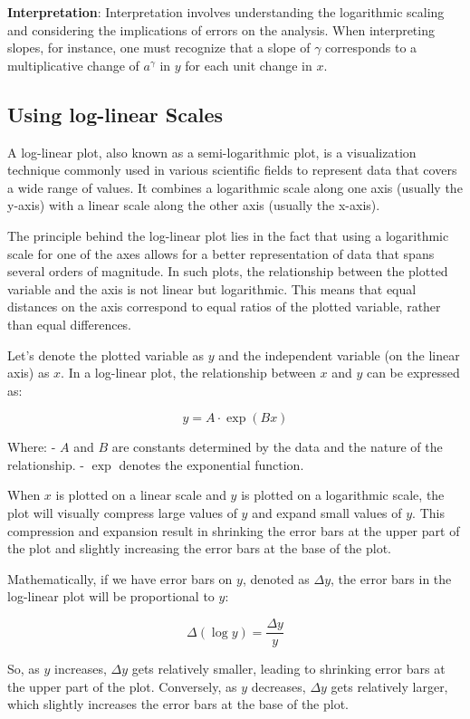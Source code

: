 \documentclass{article}
\begin{document}
\textbf{Interpretation}:
Interpretation involves understanding the logarithmic scaling and considering the implications of errors on the analysis. When interpreting slopes, for instance, one must recognize that a slope of $\gamma$ corresponds to a multiplicative change of $a^\gamma$ in $y$ for each unit change in $x$.



\subsection{Using log-linear Scales}
A log-linear plot, also known as a semi-logarithmic plot, is a visualization technique commonly used in various scientific fields to represent data that covers a wide range of values. It combines a logarithmic scale along one axis (usually the y-axis) with a linear scale along the other axis (usually the x-axis). 

The principle behind the log-linear plot lies in the fact that using a logarithmic scale for one of the axes allows for a better representation of data that spans several orders of magnitude. In such plots, the relationship between the plotted variable and the axis is not linear but logarithmic. This means that equal distances on the axis correspond to equal ratios of the plotted variable, rather than equal differences.

Let's denote the plotted variable as \( y \) and the independent variable (on the linear axis) as \( x \). In a log-linear plot, the relationship between \( x \) and \( y \) can be expressed as:

\[ y = A \cdot \exp(Bx) \]

Where:
- \( A \) and \( B \) are constants determined by the data and the nature of the relationship.
- \( \exp \) denotes the exponential function.

When \( x \) is plotted on a linear scale and \( y \) is plotted on a logarithmic scale, the plot will visually compress large values of \( y \) and expand small values of \( y \). This compression and expansion result in shrinking the error bars at the upper part of the plot and slightly increasing the error bars at the base of the plot.

Mathematically, if we have error bars on \( y \), denoted as \( \Delta y \), the error bars in the log-linear plot will be proportional to \( y \):

\[ \Delta(\log y) = \frac{\Delta y}{y} \]

So, as \( y \) increases, \( \Delta y \) gets relatively smaller, leading to shrinking error bars at the upper part of the plot. Conversely, as \( y \) decreases, \( \Delta y \) gets relatively larger, which slightly increases the error bars at the base of the plot.
\end{document}
